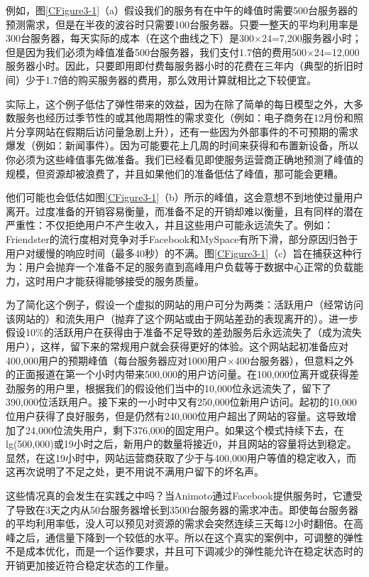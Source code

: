 例如，图\ref{CFigure3-1}（a）假设我们的服务有在中午的峰值时需要500台服务器的预测需求，但是在半夜的波谷时只需要100台服务器。只要一整天的平均利用率是300台服务器，每天实际的成本（在这个曲线之下）是300$\times$24=7,200服务器小时；但是因为我们必须为峰值准备500台服务器，我们支付1.7倍的费用500$\times$24=12,000服务器小时。因此，只要即用即付费每服务器小时的花费在三年内（典型的折旧时间）少于1.7倍的购买服务器的费用，那么效用计算就相比之下较便宜。

实际上，这个例子低估了弹性带来的效益，因为在除了简单的每日模型之外，大多数服务也经历过季节性的或其他周期性的需求变化（例如：电子商务在12月份和照片分享网站在假期后访问量急剧上升），还有一些因为外部事件的不可预期的需求爆发（例如：新闻事件）。因为可能要花上几周的时间来获得和布置新设备，所以你必须为这些峰值事先做准备。我们已经看见即使服务运营商正确地预测了峰值的规模，但资源却被浪费了，并且如果他们的准备低估了峰值，那可能会更糟。

他们可能也会低估如图\ref{CFigure3-1}（b）所示的峰值，这会意想不到地使过量用户离开。过度准备的开销容易衡量，而准备不足的开销却难以衡量，且有同样的潜在严重性：不仅拒绝用户不产生收入，并且这些用户可能永远流失了。例如：Friendster的流行度相对竞争对手Facebook和MySpace有所下滑，部分原因归咎于用户对缓慢的响应时间（最多40秒）的不满。图\ref{CFigure3-1}（c）旨在捕获这种行为：用户会抛弃一个准备不足的服务直到高峰用户负载等于数据中心正常的负载能力，这时用户才能获得能够接受的服务质量。

为了简化这个例子，假设一个虚拟的网站的用户可分为两类：活跃用户（经常访问该网站的）和流失用户（抛弃了这个网站或由于网站差劲的表现离开的）。进一步假设10\%的活跃用户在获得由于准备不足导致的差劲服务后永远流失了（成为流失用户），这样，留下来的常规用户就会获得更好的体验。这个网站起初准备应对400,000用户的预期峰值（每台服务器应对1000用户$\times$400台服务器），但意料之外的正面报道在第一个小时内带来500,000的用户访问量。在100,000位离开或获得差劲服务的用户里，根据我们的假设他们当中的10,000位永远流失了，留下了390,000位活跃用户。接下来的一小时中又有250,000位新用户访问。起初的10,000位用户获得了良好服务，但是仍然有240,000位用户超出了网站的容量。这导致增加了24,000位流失用户，剩下376,000的固定用户。如果这个模式持续下去，在lg(500,000)或19小时之后，新用户的数量将接近0，并且网站的容量将达到稳定。显然，在这19小时中，网站运营商获取了少于与400,000用户等值的稳定收入，而这再次说明了不足之处，更不用说不满用户留下的坏名声。

这些情况真的会发生在实践之中吗？当Animoto通过Facebook提供服务时，它遭受了导致在3天之内从50台服务器增长到3500台服务器的需求冲击。即使每台服务器的平均利用率低，没人可以预见对资源的需求会突然连续三天每12小时翻倍。在高峰之后，通信量下降到一个较低的水平。所以在这个真实的案例中，可调整的弹性不是成本优化，而是一个运作要求，并且可下调减少的弹性能允许在稳定状态时的开销更加接近符合稳定状态的工作量。

